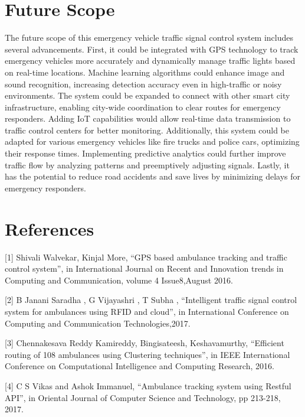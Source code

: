 \documentclass[conference]{IEEEtran}
\begin{document}
\section{Future Scope}
The future scope of this emergency vehicle traffic signal control system includes several advancements. First, it could be integrated with GPS technology to track emergency vehicles more accurately and dynamically manage traffic lights based on real-time locations. Machine learning algorithms could enhance image and sound recognition, increasing detection accuracy even in high-traffic or noisy environments. The system could be expanded to connect with other smart city infrastructure, enabling city-wide coordination to clear routes for emergency responders. Adding IoT capabilities would allow real-time data transmission to traffic control centers for better monitoring. Additionally, this system could be adapted for various emergency vehicles like fire trucks and police cars, optimizing their response times. Implementing predictive analytics could further improve traffic flow by analyzing patterns and preemptively adjusting signals. Lastly, it has the potential to reduce road accidents and save lives by minimizing delays for emergency responders.

\section{}

\section*{References}

[1] Shivali Walvekar, Kinjal More, “GPS based ambulance tracking and traffic control system”, in International Journal on Recent and Innovation trends in Computing and Communication, volume 4 Issue8,August 2016. 

[2] B Janani Saradha , G Vijayashri , T Subha , “Intelligent traffic signal control system for ambulances using RFID and cloud”, in International Conference on Computing and Communication Technologies,2017. 

[3] Chennakesava Reddy Kamireddy, Bingisateesh, Keshavamurthy, “Efficient routing of 108 ambulances using Clustering techniques”, in IEEE International Conference on Computational Intelligence and Computing Research, 2016.

[4] C S Vikas and Ashok Immanuel, “Ambulance tracking system using Restful API”, in Oriental Journal of Computer Science and Technology, pp 213-218, 2017.
\end{document}
